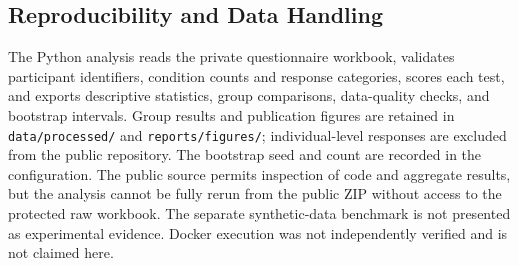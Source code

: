\subsection{Reproducibility and Data Handling}
The Python analysis reads the private questionnaire workbook, validates participant identifiers, condition counts and response categories, scores each test, and exports descriptive statistics, group comparisons, data-quality checks, and bootstrap intervals. Group results and publication figures are retained in \texttt{data/processed/} and \texttt{reports/figures/}; individual-level responses are excluded from the public repository. The bootstrap seed and count are recorded in the configuration. The public source permits inspection of code and aggregate results, but the analysis cannot be fully rerun from the public ZIP without access to the protected raw workbook. The separate synthetic-data benchmark is not presented as experimental evidence. Docker execution was not independently verified and is not claimed here.
